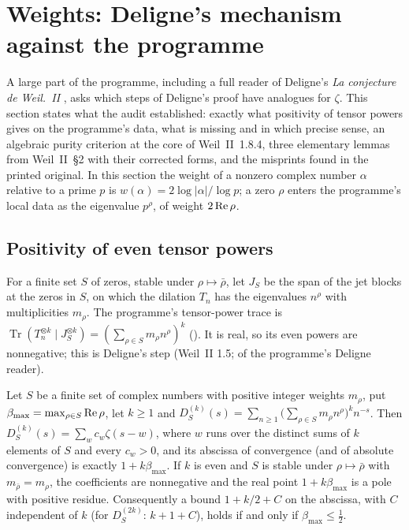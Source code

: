 \section{Weights: Deligne's mechanism against the programme}\label{sec:deligne}

A large part of the programme, including a full reader of Deligne's \emph{La conjecture de Weil.~II} \cite{DeligneWeilII}, asks which steps of Deligne's proof have analogues for $\zeta$.
This section states what the audit established: exactly what positivity of tensor powers gives on the programme's data, what is missing and in which precise sense, an algebraic purity criterion at the core of Weil~II~1.8.4, three elementary lemmas from Weil~II~§2 with their corrected forms, and the misprints found in the printed original.
In this section the weight of a nonzero complex number $\alpha$ relative to a prime $p$ is $w(\alpha)=2\log|\alpha|/\log p$; a zero $\rho$ enters the programme's local data as the eigenvalue $p^\rho$, of weight $2\operatorname{Re}\rho$.

\subsection{Positivity of even tensor powers}

For a finite set $S$ of zeros, stable under $\rho\mapsto\bar\rho$, let $J_S$ be the span of the jet blocks at the zeros in $S$, on which the dilation $T_n$ has the eigenvalues $n^\rho$ with multiplicities $m_\rho$. The programme's tensor-power trace is $\operatorname{Tr}(T_n^{\otimes k}\mid J_S^{\otimes k})=(\sum_{\rho\in S}m_\rho n^\rho)^k$ (). It is real, so its even powers are nonnegative; this is Deligne's step (Weil~II 1.5;  of the programme's Deligne reader).

\begin{proposition}\label{prop:abscissa}
Let $S$ be a finite set of complex numbers with positive integer weights $m_\rho$, put $\beta_{\max}=\max_{\rho\in S}\operatorname{Re}\rho$, let $k\ge1$ and $D_S^{(k)}(s)=\sum_{n\ge1}\big(\sum_{\rho\in S}m_\rho n^\rho\big)^{k}n^{-s}$. Then $D_S^{(k)}(s)=\sum_wc_w\zeta(s-w)$, where $w$ runs over the distinct sums of $k$ elements of $S$ and every $c_w>0$, and its abscissa of convergence (and of absolute convergence) is exactly $1+k\beta_{\max}$. If $k$ is even and $S$ is stable under $\rho\mapsto\bar\rho$ with $m_{\bar\rho}=m_\rho$, the coefficients are nonnegative and the real point $1+k\beta_{\max}$ is a pole with positive residue. Consequently a bound $1+k/2+C$ on the abscissa, with $C$ independent of $k$ (for $D_S^{(2k)}$: $k+1+C$), holds if and only if $\beta_{\max}\le\tfrac12$.
\end{proposition}


